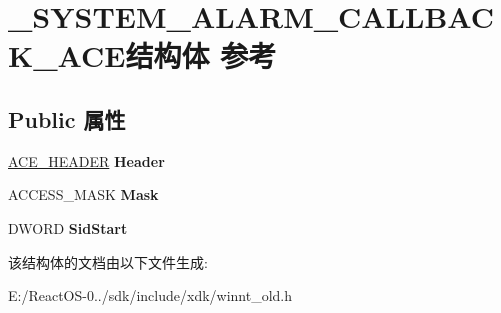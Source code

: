 \hypertarget{struct___s_y_s_t_e_m___a_l_a_r_m___c_a_l_l_b_a_c_k___a_c_e}{}\section{\+\_\+\+S\+Y\+S\+T\+E\+M\+\_\+\+A\+L\+A\+R\+M\+\_\+\+C\+A\+L\+L\+B\+A\+C\+K\+\_\+\+A\+C\+E结构体 参考}
\label{struct___s_y_s_t_e_m___a_l_a_r_m___c_a_l_l_b_a_c_k___a_c_e}
\subsection*{Public 属性}
\begin{DoxyCompactItemize}
\item 
\mbox{\label{struct___s_y_s_t_e_m___a_l_a_r_m___c_a_l_l_b_a_c_k___a_c_e_a899a745badc7cf40e43de1da7b3d1ed8}} 
\hyperlink{struct___a_c_e___h_e_a_d_e_r}{A\+C\+E\+\_\+\+H\+E\+A\+D\+ER} {\bfseries Header}
\item 
\mbox{\label{struct___s_y_s_t_e_m___a_l_a_r_m___c_a_l_l_b_a_c_k___a_c_e_a34b2fdd77f5fe50332433723142d80ab}} 
A\+C\+C\+E\+S\+S\+\_\+\+M\+A\+SK {\bfseries Mask}
\item 
\mbox{\label{struct___s_y_s_t_e_m___a_l_a_r_m___c_a_l_l_b_a_c_k___a_c_e_aeb3ca275cd85572dc4e050cb027fcc2b}} 
D\+W\+O\+RD {\bfseries Sid\+Start}
\end{DoxyCompactItemize}


该结构体的文档由以下文件生成\+:\begin{DoxyCompactItemize}
\item 
E\+:/\+React\+O\+S-\/0../sdk/include/xdk/winnt\+\_\+old.\+h\end{DoxyCompactItemize}
